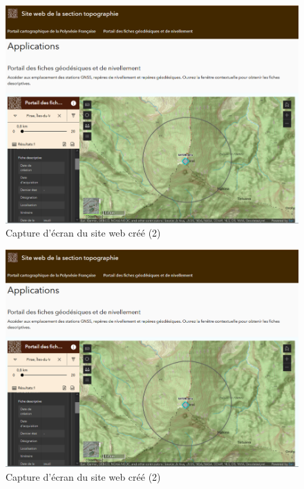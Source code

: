 \documentclass{themeensg}
\begin{document}
\begin{appendices}
\begin{figure}[!h]
\centering
\includegraphics[width=\linewidth]{images/Annexes/siteweb2.png}
\caption{Capture d'écran du site web créé (2) }
\label{site2}
\end{figure}
\label{annexepj}

\begin{figure}[!h]
\centering
\includegraphics[width=\linewidth]{images/Annexes/siteweb2.png}
\caption{Capture d'écran du site web créé (2) }
\label{site2}
\end{figure}
\label{annexepj}


\end{appendices}
\end{document}
